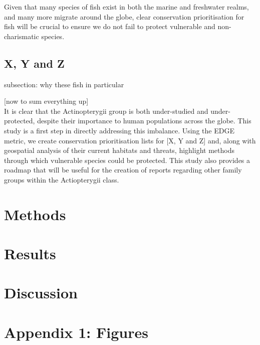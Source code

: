 \documentclass[11pt]{article}
\begin{document}
Given that many species of fish 
exist in both the marine and freshwater realms, and many more migrate around 
the globe, clear conservation prioritisation for fish will be crucial to ensure 
we do not fail to protect vulnerable and non-charismatic species. 


\subsection{X, Y  and Z}
subsection: why these fish in particular



[now to sum everything up] \\

It is clear that the Actinopterygii group is both under-studied and 
under-protected, despite their importance to human populations across the 
globe. This study is a first step in directly addressing this imbalance. Using 
the EDGE metric, we create conservation prioritisation lists for [X, Y and Z] 
and, along with geospatial analysis of their current habitats and threats, 
highlight methods through which vulnerable species could be protected. This 
study also provides a roadmap that will be useful for the creation of reports 
regarding other family groups within the Actiopterygii class.  





	\section{Methods}
	\noindent




\section{Results}
\noindent




\section{Discussion}
\noindent



\noindent
\printbibliography 


\section{Appendix 1: Figures}

	
\end{document}
